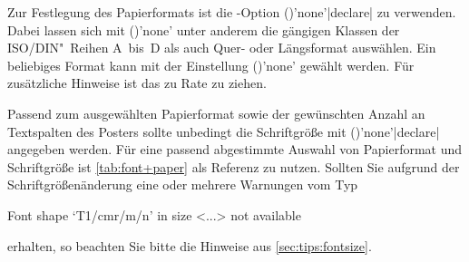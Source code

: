 \begin{Bundle*}[v2.05]{}
Zur Festlegung des Papierformats ist die \KOMAScript-Option 
()'none'|declare| zu verwenden. Dabei 
lassen sich mit ()'none' 
unter anderem die gängigen Klassen der ISO/DIN"~Reihen A~bis~D als auch Quer- 
oder Längsformat auswählen. Ein beliebiges Format kann mit der Einstellung
()'none'
gewählt werden. Für zusätzliche Hinweise ist das \scrguide zu Rate zu ziehen.

Passend zum ausgewählten Papierformat sowie der gewünschten Anzahl an 
Textspalten des Posters sollte unbedingt die Schriftgröße mit 
()'none'|declare|
angegeben werden. Für eine passend abgestimmte Auswahl von Papierformat und 
Schriftgröße ist \autoref{tab:font+paper} als Referenz zu nutzen. Sollten Sie 
aufgrund der Schriftgrößenänderung eine oder mehrere Warnungen vom Typ
%
\begin{quoting}
\begin{Code}
Font shape `T1/cmr/m/n' in size <...> not available
\end{Code}
\end{quoting}
%
erhalten, so beachten Sie bitte die Hinweise aus \autoref{sec:tips:fontsize}.



\end{Bundle*}
